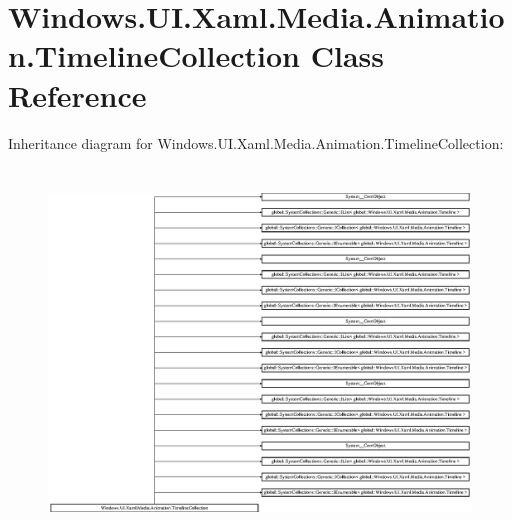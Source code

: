 \hypertarget{class_windows_1_1_u_i_1_1_xaml_1_1_media_1_1_animation_1_1_timeline_collection}{}\section{Windows.\+U\+I.\+Xaml.\+Media.\+Animation.\+Timeline\+Collection Class Reference}
\label{class_windows_1_1_u_i_1_1_xaml_1_1_media_1_1_animation_1_1_timeline_collection}
Inheritance diagram for Windows.\+U\+I.\+Xaml.\+Media.\+Animation.\+Timeline\+Collection\+:\begin{figure}[H]
\begin{center}
\leavevmode
\includegraphics[height=9.832776cm]{class_windows_1_1_u_i_1_1_xaml_1_1_media_1_1_animation_1_1_timeline_collection}
\end{center}
\end{figure}
